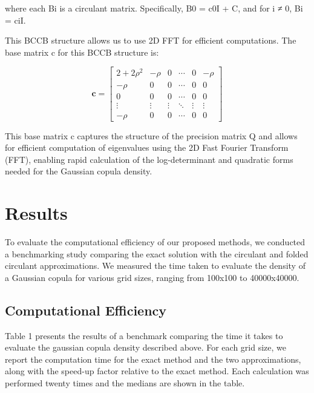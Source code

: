 \documentclass[journal=,manuscript=]{achemso}
\begin{document}
where each Bi is a circulant matrix. Specifically, B0 = c0I + C, and for
i ≠ 0, Bi = ciI.

This BCCB structure allows us to use 2D FFT for efficient computations.
The base matrix c for this BCCB structure is:

\[
\mathbf{c} = \begin{bmatrix}
2+2\rho^2 & -\rho & 0 & \cdots & 0 & -\rho \\
-\rho & 0 & 0 & \cdots & 0 & 0 \\
0 & 0 & 0 & \cdots & 0 & 0 \\
\vdots & \vdots & \vdots & \ddots & \vdots & \vdots \\
-\rho & 0 & 0 & \cdots & 0 & 0
\end{bmatrix}
\]

This base matrix c captures the structure of the precision matrix Q and
allows for efficient computation of eigenvalues using the 2D Fast
Fourier Transform (FFT), enabling rapid calculation of the
log-determinant and quadratic forms needed for the Gaussian copula
density.

\section{Results}\label{results}

To evaluate the computational efficiency of our proposed methods, we
conducted a benchmarking study comparing the exact solution with the
circulant and folded circulant approximations. We measured the time
taken to evaluate the density of a Gaussian copula for various grid
sizes, ranging from 100x100 to 40000x40000.

\subsection{Computational Efficiency}\label{computational-efficiency}

Table 1 presents the results of a benchmark comparing the time it takes
to evaluate the gaussian copula density described above. For each grid
size, we report the computation time for the exact method and the two
approximations, along with the speed-up factor relative to the exact
method. Each calculation was performed twenty times and the medians are
shown in the table.
\end{document}
